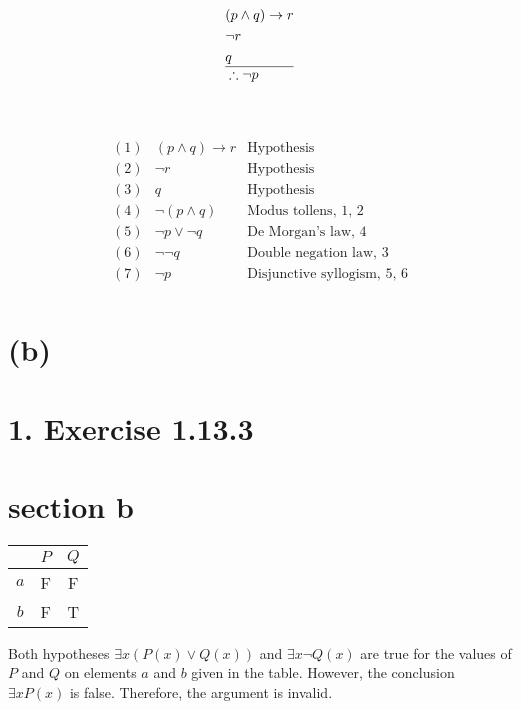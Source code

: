 \documentclass[10pt]{article}
\begin{document}

$$
\begin{aligned}
& (p \wedge q) \rightarrow r \\
& \neg r \\
& q \\
\hline
& \therefore \neg p
\end{aligned}
$$

 \\

 \\

\[
\begin{array}{rrr}
(1) & (p \wedge q) \rightarrow r & \text{Hypothesis}\\
(2) & \neg r                     & \text{Hypothesis}\\
(3) & q                          & \text{Hypothesis}\\
(4) & \neg(p \wedge q)           & \text{Modus tollens, 1, 2}\\
(5) & \neg p \vee \neg q         & \text{De Morgan's law, 4}\\
(6) & \neg \neg q                & \text{Double negation law, 3}\\
(7) & \neg p                     & \text{Disjunctive syllogism, 5, 6}\\
\end{array}
\]

\section*{(b)}
\section*{1. Exercise 1.13.3}
\section*{section b}
\begin{center}
\begin{tabular}{|c|c|c|}
\hline
 & $P$ & $Q$ \\
\hline
$a$ & F & F \\
\hline
$b$ & F & T \\
\hline
\end{tabular}
\end{center}

{Both hypotheses $\exists x(P(x) \vee Q(x))$ and $\exists x \neg Q(x)$ are true for the values of $P$ and $Q$ on elements $a$ and $b$ given in the table. However, the conclusion $\exists x P(x)$ is false. Therefore, the argument is invalid.} \\
\end{document}
